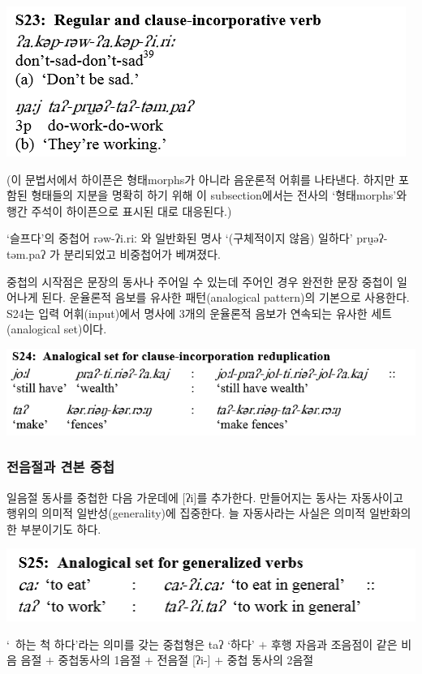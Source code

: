 \includegraphics{Pacoh/src/PacohS23}

(이 문법서에서 하이픈은 형태morphs가 아니라 음운론적 어휘를 나타낸다. 하지만 포함된 형태들의 지분을 명확히 하기 위해 이 subsection에서는 전사의 `형태morphs'와 행간 주석이 하이픈으로 표시된 대로 대응된다.)

`슬프다'의 중첩어 rəw-ʔi.riː 와 일반화된 명사 `(구체적이지 않음) 일하다' prṵəʔ-təm.paʔ 가 분리되었고 비중첩어가 베껴졌다.

중첩의 시작점은 문장의 동사나 주어일 수 있는데 주어인 경우 완전한 문장 중첩이 일어나게 된다. 운율론적 음보를 유사한 패턴(analogical pattern)의 기본으로 사용한다. S24는 입력 어휘(input)에서 명사에 3개의 운율론적 음보가 연속되는 유사한 세트(analogical set)이다. 

\includegraphics{Pacoh/src/PacohS24.png}

\subsubsection{전음절과 견본 중첩}
일음절 동사를 중첩한 다음 가운데에 [ʔi]를 추가한다. 만들어지는 동사는 자동사이고 행위의 의미적 일반성(generality)에 집중한다. 늘 자동사라는 사실은 의미적 일반화의 한 부분이기도 하다.

\includegraphics{Pacoh/src/PacohS25.png}

`~하는 척 하다'라는 의미를 갖는 중첩형은 taʔ `하다' $+$ 후행 자음과 조음점이 같은 비음 음절 $+$ 중첩동사의 1음절 $+$ 전음절 [ʔi-] $+$ 중첩 동사의 2음절

